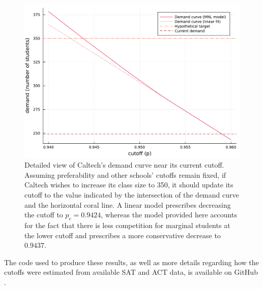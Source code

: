 \documentclass[12pt]{article}
\numberwithin{equation}{subsection}
\theoremstyle{definition}
\begin{document}
\begin{figure}
\begin{center}\includegraphics[width=\linewidth, ]{plots/caltech-demand-curve.pdf}\end{center}
\captionsetup{singlelinecheck=off}
    \caption[.]{Detailed view of Caltech's demand curve near its current cutoff. Assuming preferability and other schools' cutoffs remain fixed, if Caltech wishes to increase its class size to 350, it should update its cutoff to the value indicated by the intersection of the demand curve and the horizontal coral line. A linear model prescribes decreasing the cutoff to $p_c = 0.9424$, whereas the model provided here accounts for the fact that there is less competition for marginal students at the lower cutoff and prescribes a more conservative decrease to $0.9437$. }
\label{caltech-demand-curve}
\end{figure}








The code used to produce these results, as well as more details regarding how the cutoffs were estimated from available SAT and ACT data, is available on GitHub \parencite[][]{studentprefsrevopt}.
\end{document}
